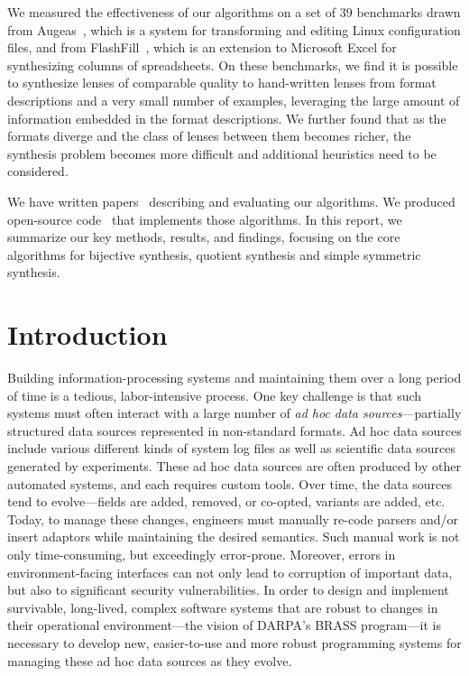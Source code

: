 \documentclass[12pt]{article}
\begin{document}
We measured the effectiveness of our
algorithms on a set of 39 benchmarks drawn from Augeas~\cite{augeas},
which is a system for transforming and editing Linux configuration
files, and from FlashFill~\cite{flashfill}, which is an extension to
Microsoft Excel for synthesizing columns of spreadsheets.
On these benchmarks, we find it is possible to synthesize lenses of
comparable quality to hand-written lenses from format descriptions and
a very small number of examples, leveraging 
the large amount of information embedded in the format descriptions. 
We further found that as the formats diverge and the class of lenses
between them becomes richer, the synthesis problem becomes more
difficult and additional heuristics need to be considered.

We have written
papers~\cite{bijective-synthesis,quotient-synthesis,symmetric-synthesis}
describing and evaluating our algorithms. We produced open-source 
code~\cite{GitHub} that implements those algorithms.  In this report,
we summarize our key methods, results, and findings, focusing
on the core algorithms for bijective synthesis, quotient synthesis and
simple symmetric synthesis.



\section{Introduction}

Building information-processing systems and maintaining them over a long
period of time is a tedious, labor-intensive process.  One key challenge is
that such systems must often interact with a large number of
\emph{ad hoc data sources}---partially structured data sources represented
in non-standard formats.  Ad hoc data sources include various
different kinds of system log files as well as scientific data sources
generated by experiments.  These ad hoc data sources are often
produced by other automated systems, and each requires custom tools.
Over time, the data sources tend to evolve---fields are added,
removed, or co-opted, variants are added, etc.  Today, to manage these
changes, engineers must manually re-code parsers and/or insert
adaptors while maintaining the desired semantics.  Such manual work is
not only time-consuming, but exceedingly error-prone.  Moreover,
errors in environment-facing interfaces can not only lead to
corruption of important data, but also to significant security
vulnerabilities.  In order to design and implement survivable,
long-lived, complex software systems that are robust to changes 
in their operational environment---the vision of
DARPA's BRASS program---it is necessary to develop new, easier-to-use
and more robust programming systems for managing these ad hoc data
sources as they evolve.
\end{document}
